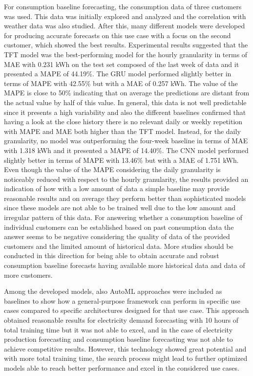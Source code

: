 For consumption baseline forecasting, the consumption data of three customers was used.
This data was initially explored and analyzed and the correlation with weather data was also studied.
After this, many different models were developed for producing accurate forecasts on this use case with a focus on the second customer, which showed the best results.
Experimental results suggested that the TFT model was the best-performing model for the hourly granularity in terms of MAE with 0.231 kWh on the test set composed of the last week of data and it presented a MAPE of 44.19\%.
The GRU model performed slightly better in terms of MAPE with 42.55\% but with a MAE of 0.257 kWh.
The value of the MAPE is close to 50\% indicating that on average the predictions are distant from the actual value by half of this value.
In general, this data is not well predictable since it presents a high variability and also the different baselines confirmed that having a look at the close history there is no relevant daily or weekly repetition with MAPE and MAE both higher than the TFT model.
Instead, for the daily granularity, no model was outperforming the four-week baseline in terms of MAE with 1.318 kWh and it presented a MAPE of 14.40\%.
The CNN model performed slightly better in terms of MAPE with 13.46\% but with a MAE of 1.751 kWh.
Even though the value of the MAPE considering the daily granularity is noticeably reduced with respect to the hourly granularity, the results provided an indication of how with a low amount of data a simple baseline may provide reasonable results and on average they perform better than sophisticated models since these models are not able to be trained well due to the low amount and irregular pattern of this data.
For answering whether a consumption baseline of individual customers can be established based on past consumption data the answer seems to be negative considering the quality of data of the provided customers and the limited amount of historical data.
More studies should be conducted in this direction for being able to obtain accurate and robust consumption baseline forecasts having available more historical data and data of more customers.

Among the developed models, also AutoML approaches were included as baselines to show how a general-purpose framework can perform in specific use cases compared to specific architectures designed for that use case.
This approach obtained reasonable results for electricity demand forecasting with 10 hours of total training time but it was not able to excel, and in the case of electricity production forecasting and consumption baseline forecasting was not able to achieve competitive results.
However, this technology showed great potential and with more total training time, the search process might lead to further optimized models able to reach better performance and excel in the considered use cases.

